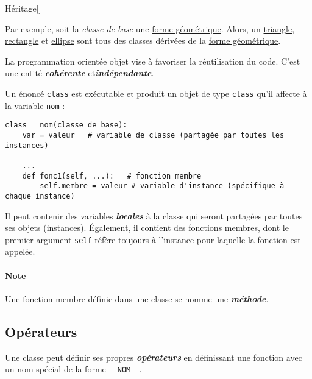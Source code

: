 \documentclass[10pt, french]{article}
\begin{document}
\begin{multicols*}{2}
\begin{definitionGENERAL}{Héritage}[]
\bigskip

Par exemple, soit la \textit{classe de base} une \underline{forme géométrique}. Alors, un \underline{triangle}, \underline{rectangle} et \underline{ellipse} sont tous des classes dérivées de la \underline{forme géométrique}.
\end{definitionGENERAL}


\begin{rappel_enhanced}[Contexte]
La programmation orientée objet vise à favoriser la réutilisation du code. C'est une entité \textbf{\textit{cohérente}} et\textit{\textbf{indépendante}}. 
\end{rappel_enhanced}

\begin{definitionNOHFILL}
Un énoncé \texttt{class} est exécutable et produit un objet de type \texttt{class} qu'il affecte à la variable \texttt{nom} :
\begin{lstlisting}
class	nom(classe_de_base):
	var = valeur   # variable de classe (partagée par toutes les instances)
	
	...
	def fonc1(self, ...):   # fonction membre
		self.membre = valeur # variable d'instance (spécifique à chaque instance)
\end{lstlisting}

\bigskip

Il peut contenir des variables \textbf{\textit{locales}} à la classe qui seront partagées par toutes ses objets (instances). Également, il contient des fonctions membres, dont le premier argument \texttt{self} réfère toujours à l'instance pour laquelle la fonction est appelée.
\end{definitionNOHFILL}

\paragraph{Note}	Une fonction membre définie dans une classe se nomme une \textbf{\textit{méthode}}.


\subsection{Opérateurs}
Une classe peut définir ses propres \textbf{\textit{opérateurs}} en définissant une fonction avec un nom spécial de la forme \texttt{\_\_NOM\_\_}. 

\bigskip


\end{multicols*}
\end{document}
